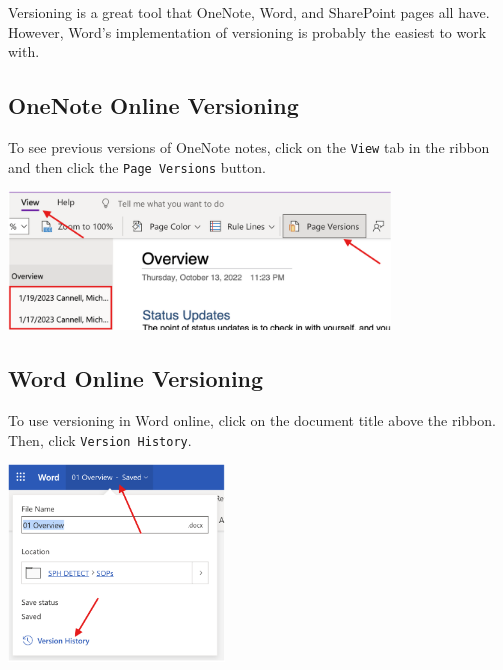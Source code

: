 \documentclass[
  letterpaper,
  DIV=11,
  numbers=noendperiod]{scrreprt}
\begin{document}
Versioning is a great tool that OneNote, Word, and SharePoint pages all
have. However, Word's implementation of versioning is probably the
easiest to work with.

\subsection*{OneNote Online Versioning}\label{onenote-online-versioning}

To see previous versions of OneNote notes, click on the \texttt{View}
tab in the ribbon and then click the \texttt{Page\ Versions} button.

\begin{center}
\includegraphics[width=3.99in,height=\textheight]{chapters/authoring_sops/../../graphics/onenote_versioning.png}
\end{center}

\subsection*{Word Online Versioning}\label{word-online-versioning}

To use versioning in Word online, click on the document title above the
ribbon. Then, click \texttt{Version\ History}.

\begin{center}
\includegraphics[width=2.26in,height=\textheight]{chapters/authoring_sops/../../graphics/word_versioning.png}
\end{center}
\end{document}
